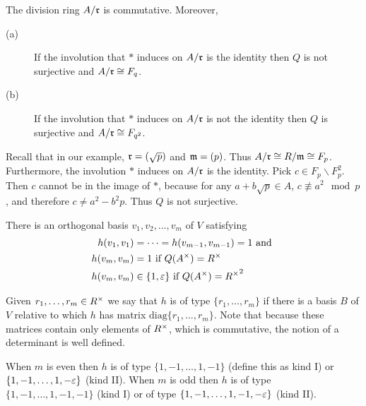 \documentclass[11pt]{article}
\begin{document}
\begin{proposition*}
The division ring $A/\mathfrak{r}$ is commutative. Moreover,
\begin{description}
\item[(a)] If the involution that $*$ induces on $A/\mathfrak{r}$ is the identity then $Q$ is not surjective and $A/\mathfrak{r} \cong F_q$.
\item[(b)] If the involution that $*$ induces on $A/\mathfrak{r}$ is not the identity then $Q$ is surjective and $A/\mathfrak{r} \cong F_{q^2}$.
\end{description}
\end{proposition*}

\begin{example*}
Recall that in our example, $\mathfrak{r} = (\sqrt{p})$ and $\mathfrak{m} = (p)$.
Thus $A/\mathfrak{r} \cong R/\mathfrak{m} \cong F_p$.
Furthermore, the involution $*$ induces on $A/\mathfrak{r}$ is the identity.
Pick $c \in F_p \backslash F_p^2$.
Then $c$ cannot be in the image of $*$, because for any $a + b\sqrt{p} \in A$,
$c \not\equiv a^2 \mod p$, and therefore $c \ne a^2 - b^2 p$.
Thus $Q$ is not surjective.
\end{example*}

\begin{theorem*}
There is an orthogonal basis $v_1, v_2, \dotsc, v_m$ of $V$ satisfying
\begin{align*}
  h(v_1, v_1) &= \dotsb = h(v_{m-1}, v_{m-1}) = 1 \text{ and } \\
  h(v_m, v_m) &= 1 \text{ if } Q(A^\times) = R^\times \\
  h(v_m, v_m) &\in \{1, \varepsilon \} \text{ if } Q(A^\times) = {R^\times}^2
\end{align*}
\end{theorem*}

\begin{definition*}
Given $r_1, \dotsc, r_m \in R^\times$ we say that $h$ is of type $\{r_1, \dotsc, r_m \}$ if there is a basis $B$ of $V$ relative to which $h$ has matrix $\text{diag} \{r_1, \dotsc, r_m \}$.
Note that because these matrices contain only elements of $R^\times$, which is commutative, the notion of a determinant is well defined.
\end{definition*}

\begin{lemma*}
When $m$ is even then $h$ is of type $\{1, -1, \dotsc, 1, -1 \}$ (define this as kind I) or $\{1, -1,\dotsc, 1, -\varepsilon \}$ (kind II).
When $m$ is odd then $h$ is of type $\{1, -1, \dotsc, 1, -1, -1 \}$ (kind I) or of type $\{1, -1, \dotsc, 1, -1, -\varepsilon \}$ (kind II).
\end{lemma*}






\newpage
\nocite{hungerford}
\nocite{katok}


\end{document}
